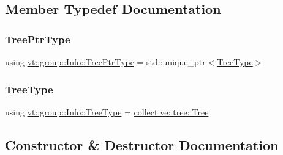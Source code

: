 \subsection{Member Typedef Documentation}
\mbox{\label{structvt_1_1group_1_1_info_ad381b46b3d09499ac670457aa3b5a0ba}} 
\subsubsection{\texorpdfstring{Tree\+Ptr\+Type}{TreePtrType}}
{\footnotesize\ttfamily using \hyperlink{structvt_1_1group_1_1_info_ad381b46b3d09499ac670457aa3b5a0ba}{vt\+::group\+::\+Info\+::\+Tree\+Ptr\+Type} =  std\+::unique\+\_\+ptr$<$\hyperlink{structvt_1_1group_1_1_info_base_a96e01b6097ed7b2bc299027d0a7a1b1e}{Tree\+Type}$>$}

\mbox{\label{structvt_1_1group_1_1_info_a7682ac1b37adcfcc2f10edee9d34bdc8}} 
\subsubsection{\texorpdfstring{Tree\+Type}{TreeType}}
{\footnotesize\ttfamily using \hyperlink{structvt_1_1group_1_1_info_a7682ac1b37adcfcc2f10edee9d34bdc8}{vt\+::group\+::\+Info\+::\+Tree\+Type} =  \hyperlink{structvt_1_1collective_1_1tree_1_1_tree}{collective\+::tree\+::\+Tree}}



\subsection{Constructor \& Destructor Documentation}
\mbox{\label{structvt_1_1group_1_1_info_ae037ba873e2888a5783ac87eb5f7a33c}} 
